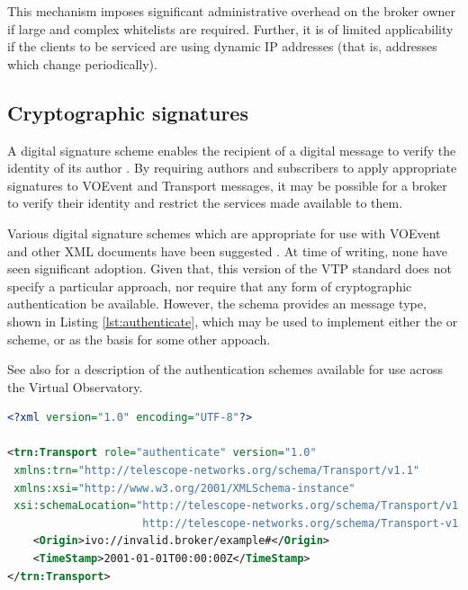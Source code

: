 \documentclass[a4paper,11pt]{ivoa}
\begin{document}
This mechanism imposes significant administrative overhead on the broker owner
if large and complex whitelists are required. Further, it is of limited
applicability if the clients to be serviced are using dynamic IP addresses
(that is, addresses which change periodically).

\subsection{Cryptographic signatures}
\label{sec:limit:crypto}

A digital signature scheme enables the recipient of a digital message to
verify the identity of its author \citep{Diffie:1976}. By requiring authors
and subscribers to apply appropriate signatures to VOEvent and Transport
messages, it may be possible for a broker to verify their identity and
restrict the services made available to them.

Various digital signature schemes which are appropriate for use with VOEvent
and other XML documents have been suggested \citep{Allen:2008, Denny:2008}. At
time of writing, none have seen significant adoption. Given that, this version
of the VTP standard does not specify a particular approach, nor require that
any form of cryptographic authentication be available. However, the
 schema provides an  message type,
shown in Listing \ref{lst:authenticate}, which may be used to implement either
the \citeauthor{Allen:2008} or \citeauthor{Denny:2008} scheme, or as the basis
for some other appoach.

See also \citet{std:SSOAUTH2} for a description of the authentication schemes
available for use across the Virtual Observatory.

\begin{lstlisting}[language=XML,caption=Sample \xmlel{authenticate} message.,
                   label=lst:authenticate]
<?xml version="1.0" encoding="UTF-8"?>

<trn:Transport role="authenticate" version="1.0"
 xmlns:trn="http://telescope-networks.org/schema/Transport/v1.1"
 xmlns:xsi="http://www.w3.org/2001/XMLSchema-instance"
 xsi:schemaLocation="http://telescope-networks.org/schema/Transport/v1.1
                     http://telescope-networks.org/schema/Transport-v1.1.xsd">
    <Origin>ivo://invalid.broker/example#</Origin>
    <TimeStamp>2001-01-01T00:00:00Z</TimeStamp>
</trn:Transport>
\end{lstlisting}

\newpage
\appendix
\end{document}
